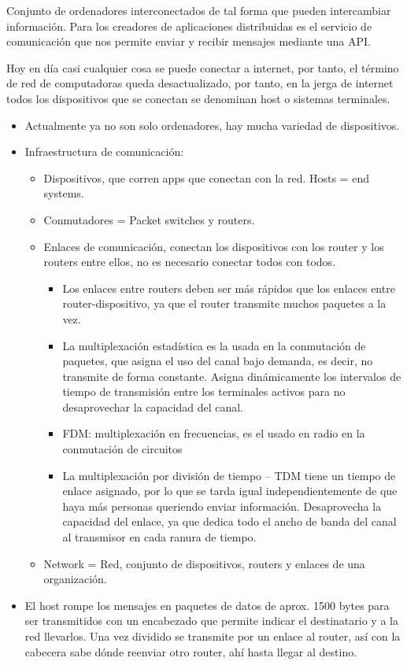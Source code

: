 \documentclass[12pt, twoside, openright]{report} %
\begin{document}
  Conjunto de ordenadores interconectados de tal forma que pueden
  intercambiar información. Para los creadores de aplicaciones
  distribuidas es el servicio de comunicación que nos permite enviar y
  recibir mensajes mediante una API.

  Hoy en día casi cualquier cosa se puede conectar a internet, por
  tanto, el término de red de computadoras queda desactualizado, por
  tanto, en la jerga de internet todos los dispositivos que se conectan
  se denominan host o sistemas terminales.

  \begin{itemize}
  \item
    Actualmente ya no son solo ordenadores, hay mucha variedad de
    dispositivos.
  \item
    Infraestructura de comunicación:

    \begin{itemize}
    \item
      Dispositivos, que corren apps que conectan con la red. Hosts = end
      systems.
    \item
      Conmutadores = Packet switches y routers.
    \item
      Enlaces de comunicación, conectan los dispositivos con los router
      y los routers entre ellos, no es necesario conectar todos con
      todos.

      \begin{itemize}
      \item
        Los enlaces entre routers deben ser más rápidos que los enlaces
        entre router-dispositivo, ya que el router transmite muchos
        paquetes a la vez.
      \item
        La multiplexación estadística es la usada en la conmutación de
        paquetes, que asigna el uso del canal bajo demanda, es decir, no
        transmite de forma constante. Asigna dinámicamente los
        intervalos de tiempo de transmisión entre los terminales activos
        para no desaprovechar la capacidad del canal.
      \item
        FDM: multiplexación en frecuencias, es el usado en radio en la
        conmutación de circuitos
      \item
        La multiplexación por división de tiempo -- TDM tiene un tiempo
        de enlace asignado, por lo que se tarda igual independientemente
        de que haya más personas queriendo enviar información.
        Desaprovecha la capacidad del enlace, ya que dedica todo el
        ancho de banda del canal al transmisor en cada ranura de tiempo.
      \end{itemize}
    \item
      Network = Red, conjunto de dispositivos, routers y enlaces de una
      organización.
    \end{itemize}
	\pagebreak
  \item
    El host rompe los mensajes en paquetes de datos de aprox. 1500 bytes
    para ser transmitidos con un encabezado que permite indicar el
    destinatario y a la red llevarlos. Una vez dividido se transmite por
    un enlace al router, así con la cabecera sabe dónde reenviar otro
    router, ahí hasta llegar al destino.


\end{itemize}
\end{document}
